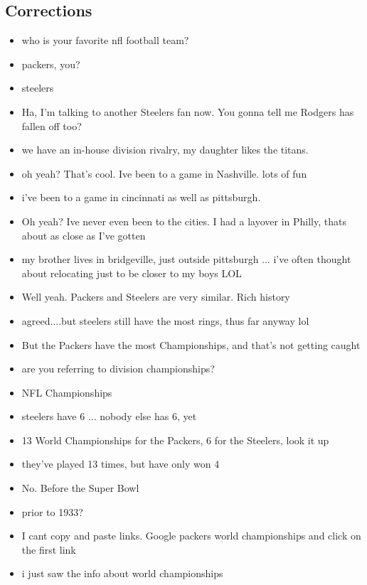 \documentclass[11pt,a4paper]{article}
\begin{document}
\subsection{Corrections}
\begin{itemize}
\itemsep0em
\item[\ding{172}] who is your favorite nfl football team?
\item[\ding{173}] packers, you?
\item[\ding{172}] steelers
\item[\ding{173}] Ha, I'm talking to another Steelers fan now.  You gonna tell me Rodgers has fallen off too?
\item[\ding{172}] we have an in-house division rivalry, my daughter likes the titans.
\item[\ding{173}] oh yeah?  That's cool.  Ive been to a game in Nashville.  lots of fun
\item[\ding{172}] i've been to a game in cincinnati as well as pittsburgh.
\item[\ding{173}] Oh yeah?  Ive never even been to the cities.  I had a layover in Philly, thats about as close as I've gotten
\item[\ding{172}] my brother lives in bridgeville, just outside pittsburgh ... i've often thought about relocating just to be closer to my boys LOL
\item[\ding{173}] Well yeah.  Packers and Steelers are very similar.  Rich history
\item[\ding{172}] agreed....but steelers still have the most rings, thus far anyway lol
\item[\ding{173}] But the Packers have the most Championships, and that's not getting caught
\item[\ding{172}] are you referring to division championships?
\item[\ding{173}] NFL Championships
\item[\ding{172}] steelers have 6 ... nobody else has 6, yet
\item[\ding{173}] 13 World Championships for the Packers, 6 for the Steelers, look it up
\item[\ding{172}] they've played 13 times, but have only won 4
\item[\ding{173}] No.  Before the Super Bowl
\item[\ding{172}] prior to 1933?
\item[\ding{173}] I cant copy and paste links.  Google packers world championships and click on the first link
\item[\ding{172}] i just saw the info about world championships

\end{itemize}
\end{document}
